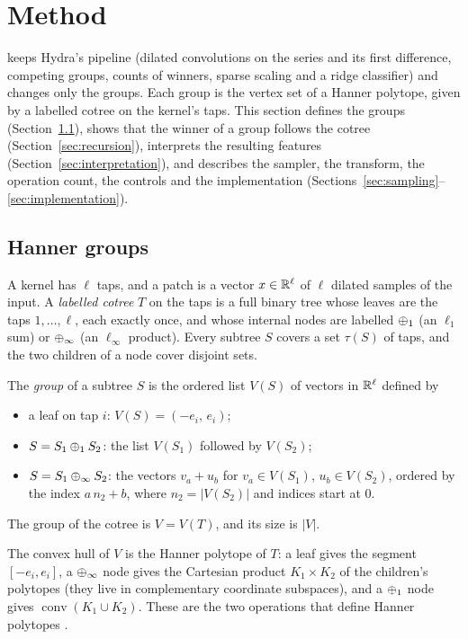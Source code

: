 \section{Method}
\label{sec:method}

\hh{} keeps Hydra's pipeline (dilated convolutions on the series and its first difference,
competing groups, counts of winners, sparse scaling and a ridge classifier) and changes
only the groups. Each group is the vertex set of a Hanner polytope, given by a labelled
cotree on the kernel's taps. This section defines the groups
(Section~\ref{sec:groups}), shows that the winner of a group follows the cotree
(Section~\ref{sec:recursion}), interprets the resulting features
(Section~\ref{sec:interpretation}), and describes the sampler, the transform, the
operation count, the controls and the implementation
(Sections~\ref{sec:sampling}--\ref{sec:implementation}).

\subsection{Hanner groups}
\label{sec:groups}

A kernel has $\ell$ taps, and a patch is a vector $x\in\mathbb{R}^\ell$ of $\ell$ dilated samples of
the input. A \emph{labelled cotree} $T$ on the taps is a full binary tree whose leaves are
the taps $1,\dots,\ell$, each exactly once, and whose internal nodes are labelled $\oplus_1$
(an $\ell_1$ sum) or $\oplus_\infty$ (an $\ell_\infty$ product). Every subtree $S$ covers a set
$\tau(S)$ of taps, and the two children of a node cover disjoint sets.

\begin{definition}
\label{def:group}
The \emph{group} of a subtree $S$ is the ordered list $V(S)$ of vectors in $\mathbb{R}^\ell$
defined by
\begin{itemize}
\item a leaf on tap $i$: $V(S)=(-e_i,\,e_i)$;
\item $S=S_1\oplus_1 S_2$: the list $V(S_1)$ followed by $V(S_2)$;
\item $S=S_1\oplus_\infty S_2$: the vectors $v_a+u_b$ for $v_a\in V(S_1)$, $u_b\in V(S_2)$,
  ordered by the index $a\,n_2+b$, where $n_2=|V(S_2)|$ and indices start at 0.
\end{itemize}
The group of the cotree is $V=V(T)$, and its size is $|V|$.
\end{definition}

The convex hull of $V$ is the Hanner polytope of $T$: a leaf gives the segment
$[-e_i,e_i]$, a $\oplus_\infty$ node gives the Cartesian product $K_1\times K_2$ of the
children's polytopes (they live in complementary coordinate subspaces), and a $\oplus_1$ node
gives $\operatorname{conv}(K_1\cup K_2)$. These are the two operations that define Hanner
polytopes \citep{hanner1956intersections,hansen1981structure}.

